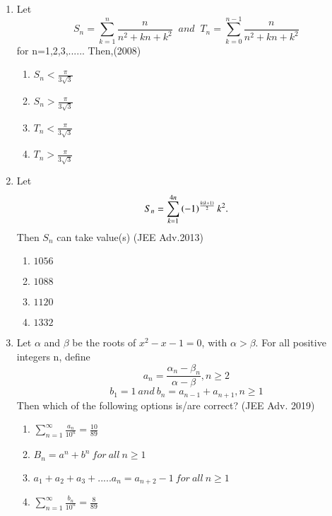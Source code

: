 \documentclass[journal,12pt,twocolumn]{IEEEtran}
\theoremstyle{remark}
\begin{document}
\begin{enumerate}
\item Let 
\begin{equation*}
S_n=\sum_{k=1}^{n}\frac{n}{n^2+kn+k^2} \;\; and \;\; T_n=\sum_{k=0}^{n-1}\frac{n}{n^2+kn+k^2}
\end{equation*}
for\;\; n=1,2,3,...... Then,\hfill{(2008)}
\begin{multicols}{2}
\begin{enumerate}
\item $S_n<\frac{\pi}{3\sqrt{3}}$
\item $S_n>\frac{\pi}{3\sqrt{3}}$
\item $T_n<\frac{\pi}{3\sqrt{3}}$
\item $T_n>\frac{\pi}{3\sqrt{3}}$
\end{enumerate}
\end{multicols}

\item Let \begin{equation*} S_n=\sum_{k=1}^{4n}\left(-1\right)^\frac{k\left(k+1\right)}{2}k^2.\end{equation*}  Then $S_n$ can take value(s)  \hfill{(JEE Adv.2013)}
\begin{multicols}{2}
\begin{enumerate}
\item $1056$
\item $1088$
\item $1120$
\item $1332$
\end{enumerate}
\end{multicols}

\item Let $\alpha$ and $\beta$ be the roots of $x^2-x-1=0$, with $\alpha>\beta$. For all positive integers n, define
\begin{equation*}
a_n=\frac{\alpha_n-\beta_n}{\alpha-\beta},n\geq2
\end{equation*}
\begin{equation*}
b_1=1 \: and \: b_n=a_{n-1}+a_{n+1},n\geq1
\end{equation*}
Then which of the following options is/are correct?
\hfill{(JEE Adv. 2019)}
\begin{enumerate}
\item $\sum_{n=1}^{\infty}\frac{a_n}{10^n}=\frac{10}{89}$
\item $B_n=a^n+b^n\:for\: all\: n\geq1$
\item $a_1+a_2+a_3+.....a_n=a_{n+2}-1\: for\: all\: n\geq1$
\item $\sum_{n=1}^{\infty}\frac{b_n}{10^n}=\frac{8}{89}$
\end{enumerate}
\end{enumerate}
\end{document}
